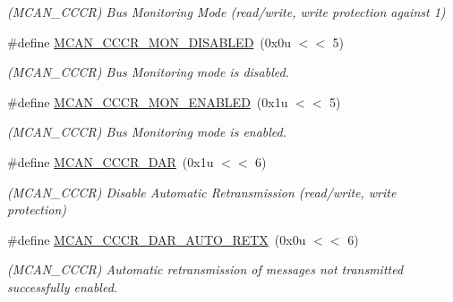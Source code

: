 \begin{DoxyCompactItemize}
\begin{DoxyCompactList}\small\item\em (M\+C\+A\+N\+\_\+\+C\+C\+CR) Bus Monitoring Mode (read/write, write protection against \textquotesingle{}1\textquotesingle{}) \end{DoxyCompactList}\item 
\mbox{\label{group__SAMV71__MCAN_ga69c46d7fbface6c5a52bad8bedfb0e65}} 
\#define \mbox{\hyperlink{group__SAMV71__MCAN_ga69c46d7fbface6c5a52bad8bedfb0e65}{M\+C\+A\+N\+\_\+\+C\+C\+C\+R\+\_\+\+M\+O\+N\+\_\+\+D\+I\+S\+A\+B\+L\+ED}}~(0x0u $<$$<$ 5)
\begin{DoxyCompactList}\small\item\em (M\+C\+A\+N\+\_\+\+C\+C\+CR) Bus Monitoring mode is disabled. \end{DoxyCompactList}\item 
\mbox{\label{group__SAMV71__MCAN_ga36a9b47ea505af619afa146112b4da3c}} 
\#define \mbox{\hyperlink{group__SAMV71__MCAN_ga36a9b47ea505af619afa146112b4da3c}{M\+C\+A\+N\+\_\+\+C\+C\+C\+R\+\_\+\+M\+O\+N\+\_\+\+E\+N\+A\+B\+L\+ED}}~(0x1u $<$$<$ 5)
\begin{DoxyCompactList}\small\item\em (M\+C\+A\+N\+\_\+\+C\+C\+CR) Bus Monitoring mode is enabled. \end{DoxyCompactList}\item 
\mbox{\label{group__SAMV71__MCAN_ga3aced5516ff86e195ce6926f518d9e53}} 
\#define \mbox{\hyperlink{group__SAMV71__MCAN_ga3aced5516ff86e195ce6926f518d9e53}{M\+C\+A\+N\+\_\+\+C\+C\+C\+R\+\_\+\+D\+AR}}~(0x1u $<$$<$ 6)
\begin{DoxyCompactList}\small\item\em (M\+C\+A\+N\+\_\+\+C\+C\+CR) Disable Automatic Retransmission (read/write, write protection) \end{DoxyCompactList}\item 
\mbox{\label{group__SAMV71__MCAN_gae1eb3d856ff903bdbbb8fb924b21d1b9}} 
\#define \mbox{\hyperlink{group__SAMV71__MCAN_gae1eb3d856ff903bdbbb8fb924b21d1b9}{M\+C\+A\+N\+\_\+\+C\+C\+C\+R\+\_\+\+D\+A\+R\+\_\+\+A\+U\+T\+O\+\_\+\+R\+E\+TX}}~(0x0u $<$$<$ 6)
\begin{DoxyCompactList}\small\item\em (M\+C\+A\+N\+\_\+\+C\+C\+CR) Automatic retransmission of messages not transmitted successfully enabled. \end{DoxyCompactList}\item 

\end{DoxyCompactItemize}
